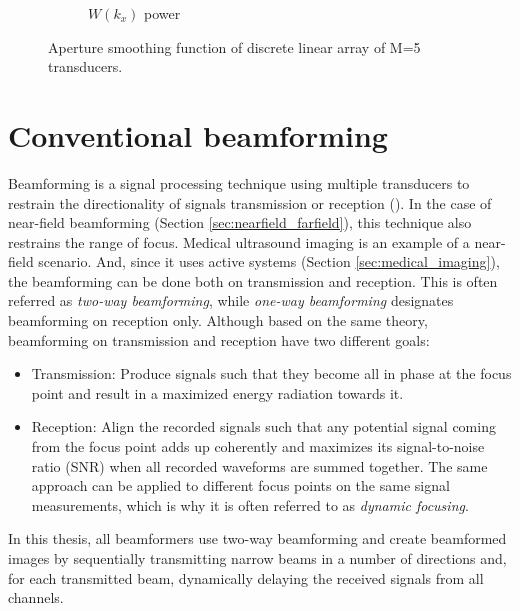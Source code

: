\begin{figure}[ht]
\begin{subfigure}[b]{0.48\linewidth}
        \caption{$W(k_x)$ power}
    \end{subfigure}
	\caption{Aperture smoothing function of discrete linear array of M=5 transducers.}
	\label{fig:total_aperture}
\end{figure}


\section{Conventional beamforming}
\label{sec:beamforming}
Beamforming is a signal processing technique using multiple transducers to restrain the directionality of signals transmission or reception (\cite{DAS}). In the case of near-field beamforming (Section \ref{sec:nearfield_farfield}), this technique also restrains the range of focus. Medical ultrasound imaging is an example of a near-field scenario. And, since it uses active systems (Section \ref{sec:medical_imaging}), the beamforming can be done both on transmission and reception. This is often referred as \textit{two-way beamforming}, while \textit{one-way beamforming} designates beamforming on reception only. Although based on the same theory, beamforming on transmission and reception have two different goals:
\begin{itemize}
    \item Transmission: Produce signals such that they become all in phase at the focus point and result in a maximized energy radiation towards it.
    \item Reception: Align the recorded signals such that any potential signal coming from the focus point adds up coherently and maximizes its signal-to-noise ratio (SNR) when all recorded waveforms are summed together. The same approach can be applied to different focus points on the same signal measurements, which is why it is often referred to as \textit{dynamic focusing}.
\end{itemize}
\noindent
In this thesis, all beamformers use two-way beamforming and create beamformed images by sequentially transmitting narrow beams in a number of directions and, for each transmitted beam, dynamically delaying the received signals from all channels.


